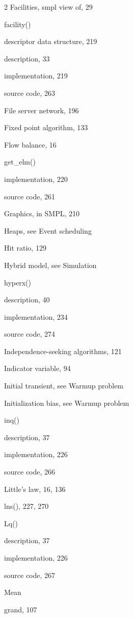 \begin{multicols}{2}
\noindent Facilities, smpl view of, 29\par
\noindent facility()\par
\quad descriptor data structure, 219\par
\quad description, 33\par
\quad implementation, 219\par
\quad source code, 263\par
\noindent File server network, 196\par
\noindent Fixed point algorithm, 133\par
\noindent Flow balance, 16\par
\noindent get\_elm()\par
\quad implementation, 220\par
\quad source code, 261\par
\noindent Graphics, in SMPL, 210\par
\noindent Heaps, see Event scheduling\par
\noindent Hit ratio, 129\par
\noindent Hybrid model, see Simulation\par
\noindent hyperx()\par
\quad description, 40\par
\quad implementation, 234\par
\quad source code, 274\par
\noindent Independence-seeking algorithms, 121\par
\noindent Indicator variable, 94\par
\noindent Initial transient, see Warmup problem\par
\noindent Initialization bias, see Warmup problem\par
\noindent inq()\par
\quad description, 37\par
\quad implementation, 226\par
\quad source code, 266\par
\noindent Little's law, 16, 136\par
\noindent lns(), 227, 270\par
\noindent Lq()\par
\quad description, 37\par
\quad implementation, 226\par
\quad source code, 267\par
\noindent Mean\par
\quad grand, 107\par

\end{multicols}
